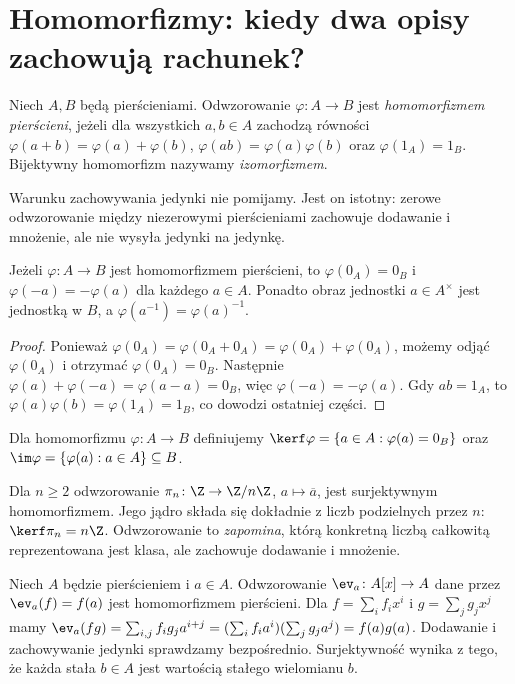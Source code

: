 \section{Homomorfizmy: kiedy dwa opisy zachowują rachunek?}

\begin{definicja}
Niech $A,B$ będą pierścieniami. Odwzorowanie
$\varphi\colon A\to B$ jest \emph{homomorfizmem pierścieni}, jeżeli dla
wszystkich $a,b\in A$ zachodzą równości
$\varphi(a+b)=\varphi(a)+\varphi(b)$,
$\varphi(ab)=\varphi(a)\varphi(b)$ oraz $\varphi(1_A)=1_B$.
Bijektywny homomorfizm nazywamy \emph{izomorfizmem}.
\end{definicja}

Warunku zachowywania jedynki nie pomijamy. Jest on istotny:
zerowe odwzorowanie między niezerowymi pierścieniami zachowuje dodawanie
i mnożenie, ale nie wysyła jedynki na jedynkę.

\begin{stwierdzenie}
Jeżeli $\varphi\colon A\to B$ jest homomorfizmem pierścieni, to
$\varphi(0_A)=0_B$ i $\varphi(-a)=-\varphi(a)$ dla każdego $a\in A$.
Ponadto obraz jednostki $a\in A^\times$ jest jednostką w $B$,
a $\varphi(a^{-1})=\varphi(a)^{-1}$.
\end{stwierdzenie}
\begin{proof}
Ponieważ $\varphi(0_A)=\varphi(0_A+0_A)
=\varphi(0_A)+\varphi(0_A)$, możemy odjąć $\varphi(0_A)$
i otrzymać $\varphi(0_A)=0_B$.
Następnie $\varphi(a)+\varphi(-a)=\varphi(a-a)=0_B$,
więc $\varphi(-a)=-\varphi(a)$.
Gdy $ab=1_A$, to $\varphi(a)\varphi(b)=\varphi(1_A)=1_B$,
co dowodzi ostatniej części.
\end{proof}

\begin{definicja}
Dla homomorfizmu $\varphi\colon A\to B$ definiujemy
$\kerf\varphi=\{a\in A:\varphi(a)=0_B\}$ oraz
$\im\varphi=\{\varphi(a):a\in A\}\subseteq B$.
\end{definicja}

\begin{przyklad}
Dla $n\ge2$ odwzorowanie
$\pi_n\colon\Z\to\Z/n\Z$, $a\mapsto\overline a$, jest
surjektywnym homomorfizmem. Jego jądro składa się dokładnie z liczb
podzielnych przez $n$: $\kerf\pi_n=n\Z$.
Odwzorowanie to \emph{zapomina}, którą konkretną liczbą całkowitą
reprezentowana jest klasa, ale zachowuje dodawanie i mnożenie.
\end{przyklad}

\begin{przyklad}
Niech $A$ będzie pierścieniem i $a\in A$. Odwzorowanie
$\ev_a\colon A[x]\to A$ dane przez $\ev_a(f)=f(a)$
jest homomorfizmem pierścieni. Dla $f=\sum_i f_ix^i$ i
$g=\sum_jg_jx^j$ mamy
$\ev_a(fg)=\sum_{i,j}f_ig_ja^{i+j}
=(\sum_if_ia^i)(\sum_jg_ja^j)=f(a)g(a)$.
Dodawanie i zachowywanie jedynki sprawdzamy bezpośrednio.
Surjektywność wynika z tego, że każda stała $b\in A$ jest wartością
stałego wielomianu $b$.
\end{przyklad}

